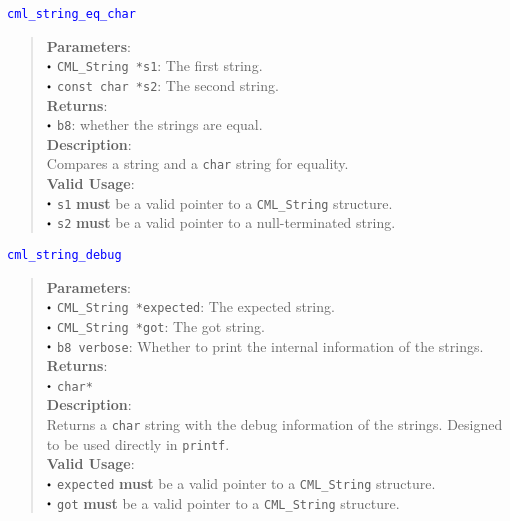 \documentclass[a4paper,oneside,8pt]{extarticle}
\newcommand{\function}[1]{
  \noindent\textcolor{blue}{\texttt{#1}}
  \vspace{-0.3em}
}
\renewcommand{\dot}{\raisebox{0.3ex}{\scalebox{0.6}{$\bullet$}}}
\theoremstyle{definition}
\begin{document}
\function{cml\_string\_eq\_char}
\begin{quote}
  \textbf{Parameters}: \\
  $\dot$ \texttt{CML\_String *s1}: The first string. \\
  $\dot$ \texttt{const char *s2}: The second string. \\
  \textbf{Returns}: \\
  $\dot$ \texttt{b8}: whether the strings are equal. \\

  \vspace{-0.75em}
  \textbf{Description}: \\
  Compares a string and a \texttt{char} string for equality. \\

  \vspace{-0.75em}
  \textbf{Valid Usage}: \\
  $\dot$ \texttt{s1} \textbf{must} be a valid pointer to a \texttt{CML\_String} structure. \\
  $\dot$ \texttt{s2} \textbf{must} be a valid pointer to a null-terminated string. \\
\end{quote}

\function{cml\_string\_debug}
\begin{quote}
  \textbf{Parameters}: \\
  $\dot$ \texttt{CML\_String *expected}: The expected string. \\
  $\dot$ \texttt{CML\_String *got}: The got string. \\
  $\dot$ \texttt{b8 verbose}: Whether to print the internal information of the strings. \\
  \textbf{Returns}: \\
  $\dot$ \texttt{char*} \\

  \vspace{-0.75em}
  \textbf{Description}: \\
  Returns a \texttt{char} string with the debug information of the strings. Designed to be used directly in \texttt{printf}. \\
  
  \vspace{-0.75em}
  \textbf{Valid Usage}: \\
  $\dot$ \texttt{expected} \textbf{must} be a valid pointer to a \texttt{CML\_String} structure. \\
  $\dot$ \texttt{got} \textbf{must} be a valid pointer to a \texttt{CML\_String} structure. \\
\end{quote}
\end{document}
